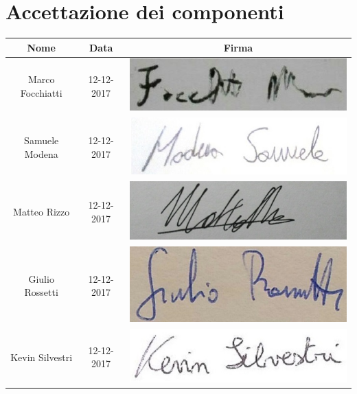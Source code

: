 \documentclass[./PianodiProgetto.tex]{subfiles}
\begin{document}
\section{Accettazione dei componenti}
\begin{table}[H]
	\centering
	\begin{tabular}{|c|c|c|}
		\hline
		Nome&Data&Firma \\ \hline
		Marco Focchiatti& 12-12-2017 &\includegraphics[scale=0.5]{img/firme/FocchiattiMarco} \\ \hline
		Samuele Modena& 12-12-2017 &\includegraphics[scale=0.5]{img/firme/ModenaSamuele} \\ \hline
		Matteo Rizzo& 12-12-2017 &\includegraphics[scale=0.5]{img/firme/RizzoMatteo} \\ \hline
		Giulio Rossetti&  12-12-2017 &\includegraphics[scale=0.5]{img/firme/RossettiGiulio} \\ \hline
		Kevin Silvestri& 12-12-2017 &\includegraphics[scale=0.5]{img/firme/SilvestriKevin} \\ \hline

\end{tabular}
\end{table}
\end{document}
